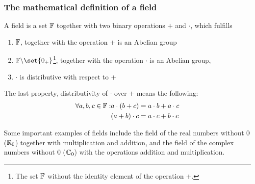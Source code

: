         \subsubsection{The mathematical definition of a field}
            A field is a set $\mathbb{F}$ together with two binary operations $+$ and $\cdot$, which fulfills
            \begin{enumerate}
                \item $\mathbb{F}$, together with the operation $+$ is an Abelian group
                \item $\F\backslash\set{0_+}$\footnote{The set $\mathbb{F}$ without the identity element of the operation $+$.}, together with the operation $\cdot$ is an Abelian group,
                \item $\cdot$ is distributive with respect to $+$
            \end{enumerate}
            The last property, distributivity of $\cdot$ over $+$ means the following:
            \begin{align}
                \forall a, b, c \in \mathbb{F}: &a \cdot (b + c) = a \cdot b + a \cdot c \\
                & (a + b) \cdot c = a \cdot c + b \cdot c
            \end{align}

            Some important examples of fields include the field of the real numbers without $0$ ($\mathbb{R}_0$) together with multiplication and addition, and the field of the complex numbers without $0$ ($\mathbb{C}_0$) with the operations addition and multiplication. \\

